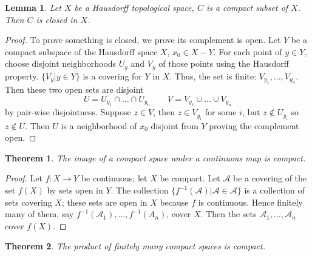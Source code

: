 \documentclass[article,11pt, reqno]{article}
\newtheorem*{theorem}{Theorem}
\newtheorem*{lemma}{Lemma}
\theoremstyle{remark}
\newcommand{\inv}{^{-1}}
\newcommand{\mc}{\mathcal}
\newcommand{\<}{\langle}
\renewcommand{\>}{\rangle}
\begin{document}
\begin{lemma}
    Let $X$ be a Hausdorff topological space, $C$ is a compact subset of $X$. Then $C$ is closed in $X$.
\end{lemma}
\begin{proof}
    To prove something is closed, we prove its complement is open. Let $Y$ be a compact subspace of the Hausdorff space $X$, $x_0\in X-Y$. For each point of $y\in Y$, choose disjoint neighborhoods $U_y$ and $V_y$ of those points using the Hausdorff property. $\{V_y|y\in Y\}$ is a covering for $Y$ in $X$. Thus, the set is finite: $V_{y_1},\dots,V_{y_n}$. Then these two open sets are disjoint 
    $$
        U=U_{y_1}\cap\dots\cap U_{y_n}\qquad V=V_{y_1}\cup\dots\cup V_{y_n}
    $$
    by pair-wise disjointness. Suppose $z\in V$, then $z\in V_{y_i}$ for some $i$, but $z\notin U_{y_i}$ so $z\notin U$. Then $U$ is a neighborhood of $x_0$ disjoint from $Y$ proving the complement open.
\end{proof}
\begin{theorem}
    The image of a compact space under a continuous map is compact.
\end{theorem}
\begin{proof}
    Let $f: X\rightarrow Y$ be continuous; 
    let $X$ be compact. Let $\mc A$ be a covering of the set $f (X)$ by sets open in $Y$. 
    The collection $\{ f\inv(\mc A) |\mc A \in\mc A\}$ is a collection of sets covering $X$; these sets are open in $X$ because $f$ is continuous. Hence finitely many of them, say $f\inv(\mc A_1),\dots, f\inv(A_n)$, cover $X$. Then the sets $\mc A_1,\dots,\mc A_n$ cover $f(X)$.
\end{proof}
\begin{theorem}
    The product of finitely many compact spaces is compact.
\end{theorem}
\end{document}
